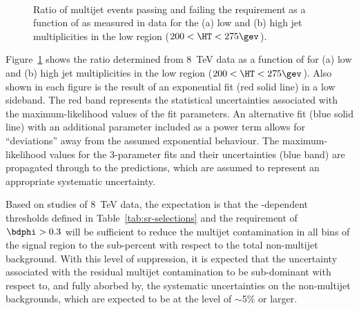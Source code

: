 \begin{figure}[!h]
  \centering
   \\
  \caption{Ratio of multijet events passing and failing the \mhtmet
    requirement as a function of \alphat as measured in data for the
    (a) low and (b) high jet multiplicities in
    the low \HT region ($200 < \HT < 275\gev$). }
  \label{fig:qcd-ratio-data}
\end{figure}

Figure~\ref{fig:qcd-ratio-data} shows the ratio \rmhtmet determined
from 8~TeV data as a function of \alphat for (a) low and (b) high jet
multiplicities in the low \HT region ($200 < \HT < 275\gev$).  Also
shown in each figure is the result of an exponential fit (red solid
line) in a low \alphat sideband. The red band represents the
statistical uncertainties associated with the maximum-likelihood
values of the fit parameters. An alternative fit (blue solid line)
with an additional parameter included as a power term allows for
``deviations'' away from the assumed exponential behaviour. The
maximum-likelihood values for the 3-parameter fits and their
uncertainties (blue band) are propagated through to the predictions,
which are assumed to represent an appropriate systematic uncertainty.

Based on studies of 8~TeV data, the expectation is that the
\HT-dependent \alphat thresholds defined in
Table~\ref{tab:sr-selections} and the requirement of $\bdphi > 0.3$
will be sufficient to reduce the multijet contamination in all bins of
the signal region to the sub-percent with respect to the total
non-multijet background. With this level of suppression, it is
expected that the uncertainty associated with the residual multijet
contamination to be sub-dominant with respect to, and fully aborbed
by, the systematic uncertainties on the non-multijet backgrounds,
which are expected to be at the level of $\sim$5\% or larger. 

